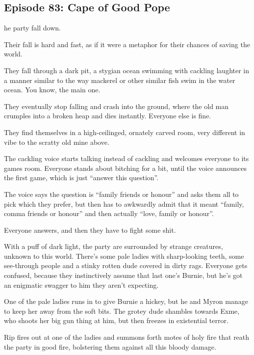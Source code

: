 \subsection{Episode 83: Cape of Good Pope}

he party fall down.\medskip

Their fall is hard and fast, as if it were a metaphor for their chances of saving the world.\medskip

They fall through a dark pit, a stygian ocean swimming with cackling laughter in a manner similar to the way mackerel or other similar fish swim in the water ocean. You know, the main one.\medskip

They eventually stop falling and crash into the ground, where the old man crumples into a broken heap and dies instantly. Everyone else is fine.\medskip

They find themselves in a high-ceilinged, ornately carved room, very different in vibe to the scratty old mine above.\medskip

The cackling voice starts talking instead of cackling and welcomes everyone to its games room. Everyone stands about bitching for a bit, until the voice announces the first game, which is just “answer this question”.\medskip

The voice says the question is “family friends or honour” and asks them all to pick which they prefer, but then has to awkwardly admit that it meant “family, comma friends or honour” and then actually “love, family or honour”.\medskip

Everyone answers, and then they have to fight some shit.\medskip

With a puff of dark light, the party are surrounded by strange creatures, unknown to this world. There’s some pale ladies with sharp-looking teeth, some see-through people and a stinky rotten dude covered in dirty rags. Everyone gets confused, because they instinctively assume that last one’s Burnie, but he’s got an enigmatic swagger to him they aren’t expecting.\medskip

One of the pale ladies runs in to give Burnie a hickey, but he and Myron manage to keep her away from the soft bits. The grotey dude shambles towards Exme, who shoots her big gun thing at him, but then freezes in existential terror.\medskip

Rip fires out at one of the ladies and summons forth motes of holy fire that reath the party in good fire, bolstering them against all this bloody damage.\medskip

